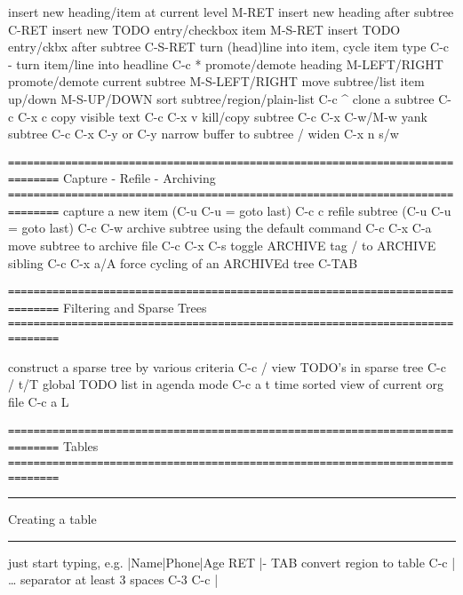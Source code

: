\documentclass[10pt,a4paper]{article}
\begin{document}
insert new heading/item at current level          M-RET
insert new heading after subtree                  C-RET
insert new TODO entry/checkbox item               M-S-RET
insert TODO entry/ckbx after subtree              C-S-RET
turn (head)line into item, cycle item type        C-c -
turn item/line into headline                      C-c *
promote/demote heading                            M-LEFT/RIGHT
promote/demote current subtree                    M-S-LEFT/RIGHT
move subtree/list item up/down                    M-S-UP/DOWN
sort subtree/region/plain-list                    C-c \^{}
clone a subtree                                   C-c C-x c
copy visible text                                 C-c C-x v
kill/copy subtree                                 C-c C-x C-w/M-w
yank subtree                                      C-c C-x C-y or C-y
narrow buffer to subtree / widen                  C-x n s/w

\texttt{==============================================================================}
Capture - Refile - Archiving
\texttt{==============================================================================}
capture a new item (C-u C-u = goto last)          C-c c \noteone
refile subtree (C-u C-u = goto last)              C-c C-w
archive subtree using the default command         C-c C-x C-a
move subtree to archive file                      C-c C-x C-s
toggle ARCHIVE tag / to ARCHIVE sibling           C-c C-x a/A
force cycling of an ARCHIVEd tree                 C-TAB

\texttt{==============================================================================}
Filtering and Sparse Trees
\texttt{==============================================================================}

construct a sparse tree by various criteria       C-c /
view TODO's in sparse tree                        C-c / t/T
global TODO list in agenda mode                   C-c a t \noteone
time sorted view of current org file              C-c a L

\texttt{==============================================================================}
Tables
\texttt{==============================================================================}

\rule{\linewidth}{0.5pt}
Creating a table

\rule{\linewidth}{0.5pt}

just start typing, e.g.                           |Name|Phone|Age RET |- TAB
convert region to table                           C-c |
\ldots{} separator at least 3 spaces                   C-3 C-c |
\end{document}
